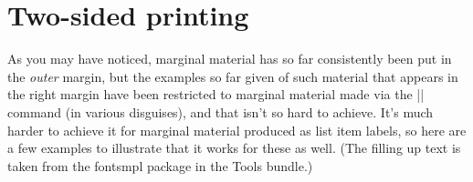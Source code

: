 \documentclass[twoside]{ltxdoc}
\DeclareRobustCommand\package[1]{\textsf{#1}}
\begin{document}
\MakePercentIgnore
% 
\def\make_pltotf{
   \pout_line\output_pltotf{pltotf~\TeX_font_name.pl~
      \ifisstr{TFMfileprefix}\then \str{TFMfileprefix}\fi
      \TeX_font_name.tfm
   }
}
% 
\MakePercentComment

\clearpage

\section{Two-sided printing}

As you may have noticed, marginal material has so far consistently 
been put in the \emph{outer} margin, but the examples so far given of 
such material that appears in the right margin have been restricted 
to marginal material made via the |\marginpar| command (in various 
disguises), and that isn't so hard to achieve. It's much harder to 
achieve it for marginal material produced as list item labels, so here 
are a few examples to illustrate that it works for these as well. (The 
filling up text is taken from the \package{fontsmpl} package in the 
Tools bundle.)
\end{document}
